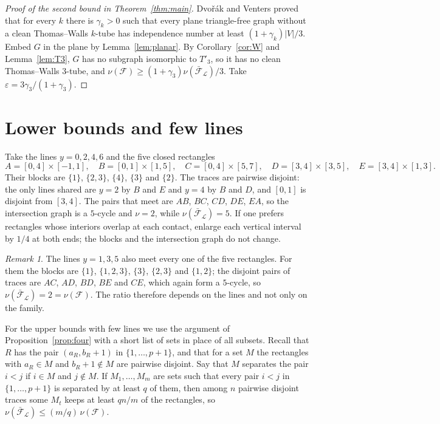 \documentclass[11pt]{article}
\theoremstyle{remark}
\newtheorem{remark}[theorem]{Remark}
\newcommand{\F}{\mathcal{F}}
\newcommand{\Fb}{\bar{\mathcal{F}}}
\newcommand{\cL}{\mathcal{L}}
\begin{document}
\begin{proof}[Proof of the second bound in Theorem~\ref{thm:main}]
Dvo\v{r}\'ak and Venters \cite[Theorem~2]{DV} proved that for every $k$ there is $\gamma_k>0$ such that every plane triangle-free graph without a clean Thomas--Walls $k$-tube has independence number at least $(1+\gamma_k)|V|/3$. Embed $G$ in the plane by Lemma~\ref{lem:planar}. By Corollary~\ref{cor:W} and Lemma~\ref{lem:T3}, $G$ has no subgraph isomorphic to $T'_3$, so it has no clean Thomas--Walls $3$-tube, and $\nu(\F)\ge(1+\gamma_3)\nu(\Fb_\cL)/3$. Take $\varepsilon=3\gamma_3/(1+\gamma_3)$.
\end{proof}

\section{Lower bounds and few lines}\label{sec:lower}

Take the lines $y=0,2,4,6$ and the five closed rectangles
\[
A=[0,4]\times[-1,1],\quad B=[0,1]\times[1,5],\quad C=[0,4]\times[5,7],\quad D=[3,4]\times[3,5],\quad E=[3,4]\times[1,3].
\]
Their blocks are $\{1\}$, $\{2,3\}$, $\{4\}$, $\{3\}$ and $\{2\}$. The traces are pairwise disjoint: the only lines shared are $y=2$ by $B$ and $E$ and $y=4$ by $B$ and $D$, and $[0,1]$ is disjoint from $[3,4]$. The pairs that meet are $AB$, $BC$, $CD$, $DE$, $EA$, so the intersection graph is a $5$-cycle and $\nu=2$, while $\nu(\Fb_\cL)=5$. If one prefers rectangles whose interiors overlap at each contact, enlarge each vertical interval by $1/4$ at both ends; the blocks and the intersection graph do not change.

\begin{remark}\label{rem:choice}
The lines $y=1,3,5$ also meet every one of the five rectangles. For them the blocks are $\{1\}$, $\{1,2,3\}$, $\{3\}$, $\{2,3\}$ and $\{1,2\}$; the disjoint pairs of traces are $AC$, $AD$, $BD$, $BE$ and $CE$, which again form a $5$-cycle, so $\nu(\Fb_\cL)=2=\nu(\F)$. The ratio therefore depends on the lines and not only on the family.
\end{remark}

For the upper bounds with few lines we use the argument of Proposition~\ref{prop:four} with a short list of sets in place of all subsets. Recall that $R$ has the pair $(a_R,b_R+1)$ in $\{1,\dots,p+1\}$, and that for a set $M$ the rectangles with $a_R\in M$ and $b_R+1\notin M$ are pairwise disjoint. Say that $M$ separates the pair $i<j$ if $i\in M$ and $j\notin M$. If $M_1,\dots,M_m$ are sets such that every pair $i<j$ in $\{1,\dots,p+1\}$ is separated by at least $q$ of them, then among $n$ pairwise disjoint traces some $M_t$ keeps at least $qn/m$ of the rectangles, so $\nu(\Fb_\cL)\le (m/q)\,\nu(\F)$.
\end{document}
